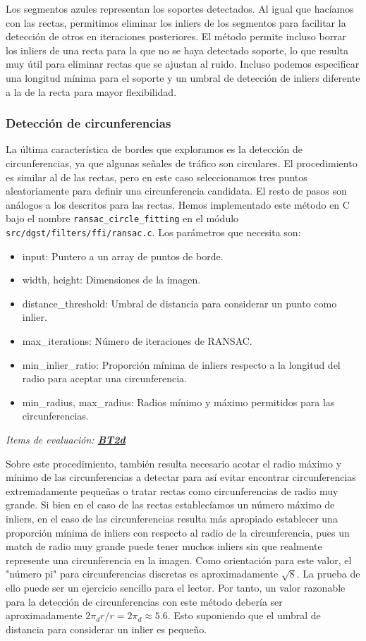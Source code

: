 \documentclass[11pt,a4paper]{article}
\begin{document}
Los segmentos azules representan los soportes detectados. Al igual que hacíamos con las rectas,
permitimos eliminar los inliers de los segmentos para facilitar la detección de otros en iteraciones posteriores.
El método permite incluso borrar los inliers de una recta para la que no se haya detectado soporte, lo que resulta muy útil para eliminar rectas que se ajustan al ruido.
Incluso podemos especificar una longitud mínima para el soporte y un umbral de detección de inliers diferente a la de la recta para mayor flexibilidad.

\subsubsection{Detección de circunferencias}

La última característica de bordes que exploramos es la detección de circunferencias, ya que algunas señales de tráfico son circulares.
El procedimiento es similar al de las rectas, pero en este caso seleccionamos tres puntos aleatoriamente para definir una circunferencia candidata.
El resto de pasos son análogos a los descritos para las rectas. Hemos implementado este método en C bajo el nombre \texttt{ransac\_circle\_fitting}
en el módulo \texttt{src/dgst/filters/ffi/ransac.c}.
Los parámetros que necesita son:
\begin{itemize}
    \item input: Puntero a un array de puntos de borde.
    \item width, height: Dimensiones de la imagen.
    \item distance\_threshold: Umbral de distancia para considerar un punto como inlier.
    \item max\_iterations: Número de iteraciones de RANSAC.
    \item min\_inlier\_ratio: Proporción mínima de inliers respecto a la longitud del radio para aceptar una circunferencia.
    \item min\_radius, max\_radius: Radios mínimo y máximo permitidos para las circunferencias.
\end{itemize}

\textit{Items de evaluación: \underline{\textbf{BT2d}}}

Sobre este procedimiento, también resulta necesario acotar el radio máximo y mínimo de las circunferencias a detectar para así evitar encontrar circunferencias extremadamente pequeñas o tratar rectas como circunferencias de radio muy grande.
Si bien en el caso de las rectas establecíamos un número máximo de inliers, en el caso de las circunferencias resulta más apropiado establecer una proporción mínima de inliers con respecto al radio de la circunferencia, pues un match de radio muy grande puede tener muchos inliers sin que realmente represente una circunferencia en la imagen. 
Como orientación para este valor, el "número pi" para circunferencias discretas es aproximadamente $\sqrt{8}$. 
La prueba de ello puede ser un ejercicio sencillo para el lector. 
Por tanto, un valor razonable para la detección de circunferencias con este método debería ser aproximadamente $2 \pi_d r / r = 2 \pi_d \approx 5.6$. Esto suponiendo que el umbral de distancia para considerar un inlier es pequeño.
\end{document}
